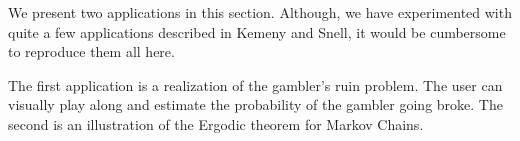 We present two applications in this section. Although, we have
experimented with quite a few applications described in Kemeny and
Snell\cite{kemsnell}, it would be cumbersome to reproduce them all
here. 

The first application is a realization of the gambler's ruin problem.
The user can visually play along and estimate the probability of the
gambler going broke.  The second is an illustration of the Ergodic
theorem for Markov Chains.

